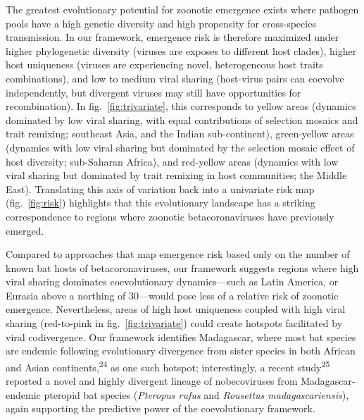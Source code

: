 \documentclass[11pt]{article}
\begin{document}
The greatest evolutionary potential for zoonotic emergence exists where
pathogen pools have a high genetic diversity and high propensity for
cross-species transmission. In our framework, emergence risk is
therefore maximized under higher phylogenetic diversity (viruses are
exposes to different host clades), higher host uniqueness (viruses are
experiencing novel, heterogeneous host traits combinations), and low to
medium viral sharing (host-virus pairs can coevolve independently, but
divergent viruses may still have opportunities for recombination). In
fig.~\ref{fig:trivariate}, this corresponds to yellow areas (dynamics
dominated by low viral sharing, with equal contributions of selection
mosaics and trait remixing; southeast Asia, and the Indian
sub-continent), green-yellow areas (dynamics with low viral sharing but
dominated by the selection mosaic effect of host diversity; sub-Saharan
Africa), and red-yellow areas (dynamics with low viral sharing but
dominated by trait remixing in host communities; the Middle East).
Translating this axis of variation back into a univariate risk map
(fig.~\ref{fig:risk}) highlights that this evolutionary landscape has a
striking correspondence to regions where zoonotic betacoronaviruses have
previously emerged.

Compared to approaches that map emergence risk based only on the number
of known bat hosts of betacoronaviruses, our framework suggests regions
where high viral sharing dominates coevolutionary dynamics---such as
Latin America, or Eurasia above a northing of 30---would pose less of a
relative risk of zoonotic emergence. Nevertheless, areas of high host
uniqueness coupled with high viral sharing (red-to-pink in
fig.~\ref{fig:trivariate}) could create hotspots facilitated by viral
codivergence. Our framework identifies Madagascar, where most bat
species are endemic following evolutionary divergence from sister
species in both African and Asian continents,\textsuperscript{24} as one
such hotspot; interestingly, a recent study\textsuperscript{25} reported
a novel and highly divergent lineage of nobecoviruses from
Madagascar-endemic pteropid bat species (\emph{Pteropus rufus} and
\emph{Rousettus madagascariensis}), again supporting the predictive
power of the coevolutionary framework.
\end{document}
